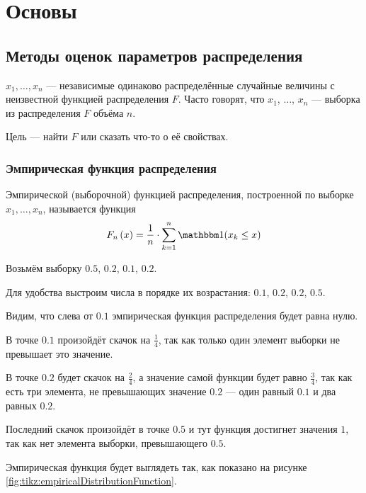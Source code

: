 \chapter{Основы}
\section{Методы оценок параметров распределения}
$x_1, \dots, x_n$ --- независимые одинаково распределённые случайные величины
с неизвестной функцией распределения $F$.
Часто говорят, что $x_1$, $\dots$, $x_n$ --- выборка из распределения $F$
объёма $n$.

Цель --- найти $F$ или сказать что-то о её свойствах.

\subsection{Эмпирическая функция распределения}
\begin{definition}
  Эмпирической (выборочной) функцией распределения,
  построенной по выборке $x_1, \dots, x_n$, называется функция
  $$\cdfn{x}=\frac{1}{n}\cdot \sum_{k=1}^n
  \indicator{x_k\le x}$$
\end{definition}

\begin{example}
  \label{ex:empiricalDistributionFunction}
  Возьмём выборку $0.5$, $0.2$, $0.1$, $0.2$.

  Для удобства выстроим числа в порядке их возрастания:
  $0.1$, $0.2$, $0.2$, $0.5$.

  Видим, что слева от $0.1$ эмпирическая функция распределения будет равна
  нулю.

  В точке $0.1$ произойдёт скачок на $\frac{1}{4}$, так как только один
  элемент выборки не превышает это значение.

  В точке $0.2$ будет скачок на $\frac{2}{4}$, а значение самой функции
  будет равно $\frac{3}{4}$, так как есть три элемента, не превышающих
  значение $0.2$ --- один равный $0.1$ и два равных $0.2$.

  Последний скачок произойдёт в точке $0.5$ и тут функция достигнет
  значения $1$, так как нет элемента выборки, превышающего
  $0.5$.

  Эмпирическая функция будет выглядеть так, как показано на
  рисунке \ref{fig:tikz:empiricalDistributionFunction}.
\end{example}

